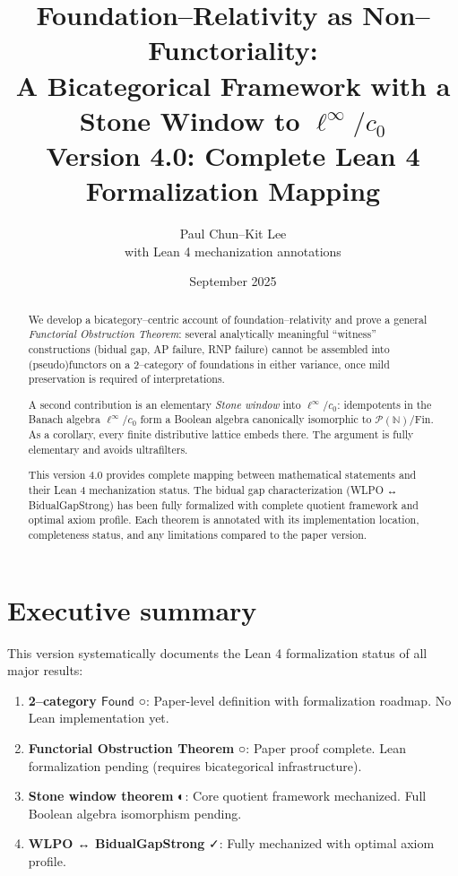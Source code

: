 \documentclass[11pt]{article}
\title{Foundation--Relativity as Non--Functoriality:\\
A Bicategorical Framework with a Stone Window to \(\ell^\infty/c_0\)\\
\large{Version 4.0: Complete Lean 4 Formalization Mapping}}
\author{Paul Chun--Kit Lee\\
\small{with Lean 4 mechanization annotations}}
\date{September 2025}
\theoremstyle{definition}
\theoremstyle{remark}
\newcommand{\leanok}{\textcolor{green!70!black}{✓}}
\newcommand{\leanpartial}{\textcolor{orange!70!black}{◐}}
\newcommand{\leanpending}{\textcolor{red!70!black}{○}}
\newcommand{\Found}{\mathsf{Found}}
\begin{document}
\maketitle

\begin{abstract}
We develop a bicategory--centric account of foundation--relativity and prove a general \emph{Functorial Obstruction Theorem}: several analytically meaningful ``witness'' constructions (bidual gap, AP failure, RNP failure) cannot be assembled into (pseudo)functors on a 2--category of foundations in either variance, once mild preservation is required of interpretations. 

A second contribution is an elementary \emph{Stone window} into \(\ell^\infty/c_0\): idempotents in the Banach algebra \(\ell^\infty/c_0\) form a Boolean algebra canonically isomorphic to \(\mathcal{P}(\mathbb N)/\mathrm{Fin}\). As a corollary, every finite distributive lattice embeds there. The argument is fully elementary and avoids ultrafilters.

This version 4.0 provides complete mapping between mathematical statements and their Lean 4 mechanization status. The bidual gap characterization (WLPO ↔ BidualGapStrong) has been fully formalized with complete quotient framework and optimal axiom profile. Each theorem is annotated with its implementation location, completeness status, and any limitations compared to the paper version.
\end{abstract}

\tableofcontents

\section{Executive summary}\label{sec:summary}

This version systematically documents the Lean 4 formalization status of all major results:

\begin{enumerate}
\item \textbf{2--category \(\Found\)} \leanpending: Paper-level definition with formalization roadmap. No Lean implementation yet.

\item \textbf{Functorial Obstruction Theorem} \leanpending: Paper proof complete. Lean formalization pending (requires bicategorical infrastructure).

\item \textbf{Stone window theorem} \leanpartial: Core quotient framework mechanized. Full Boolean algebra isomorphism pending.

\item \textbf{WLPO ↔ BidualGapStrong} \leanok: Fully mechanized with optimal axiom profile.
\end{enumerate}
\end{document}

